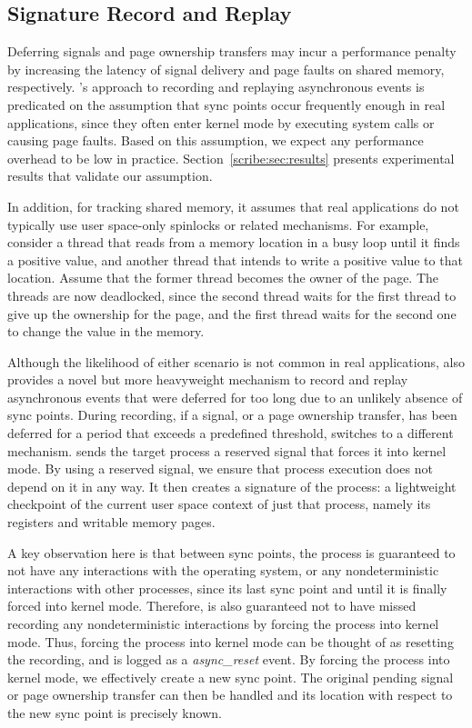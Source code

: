 \subsection{Signature Record and Replay}

Deferring signals and page ownership transfers may incur a performance
penalty by increasing the latency of signal delivery and page faults
on shared memory, respectively.  \scribe{}'s approach to recording and
replaying asynchronous events is predicated on the assumption that
sync points occur frequently enough in real applications, since they
often enter kernel mode by executing system calls or causing page
faults. Based on this assumption, we expect any performance overhead
to be low in practice.  Section~\ref{scribe:sec:results} presents
experimental results that validate our assumption.

In addition, for tracking shared memory, it assumes that real
applications do not typically use user space-only spinlocks or related
mechanisms.  For example, consider a thread that reads from a memory
location in a busy loop until it finds a positive value, and another
thread that intends to write a positive value to that location.
Assume that the former thread becomes the owner of the page.  The
threads are now deadlocked, since the second thread waits for the
first thread to give up the ownership for the page, and the first
thread waits for the second one to change the value in the memory.

Although the likelihood of either scenario is not common in real
applications, \scribe{} also provides a novel but more heavyweight
mechanism to record and replay asynchronous events that were
deferred for too long due to an unlikely absence of sync points.
During recording, if a signal, or a page ownership transfer, has been
deferred for a period that exceeds a predefined threshold, \scribe{}
switches to a different mechanism.
\scribe{} sends the target process a reserved signal that forces it
into kernel mode.  By using a reserved signal, we ensure that process
execution does not depend on it in any way. It then creates a
signature of the process: a lightweight checkpoint of the current
user space context of just that process, namely its registers and
writable memory pages.

  

A key observation here is that between sync points, the process is
guaranteed to not have any interactions
with the operating system, or any nondeterministic interactions with
other processes, since its last sync point and until it is finally
forced into kernel mode.  Therefore, \scribe{} is also guaranteed not
to have missed recording any nondeterministic interactions by forcing
the process into kernel mode. Thus, forcing the process into kernel
mode can be thought of as resetting the recording, and is logged as a
{\it async\_reset} event.  By forcing the process into kernel mode, we
effectively create a new sync point.  The original pending signal or
page ownership transfer can then be handled and its location with
respect to the new sync point is precisely known.

